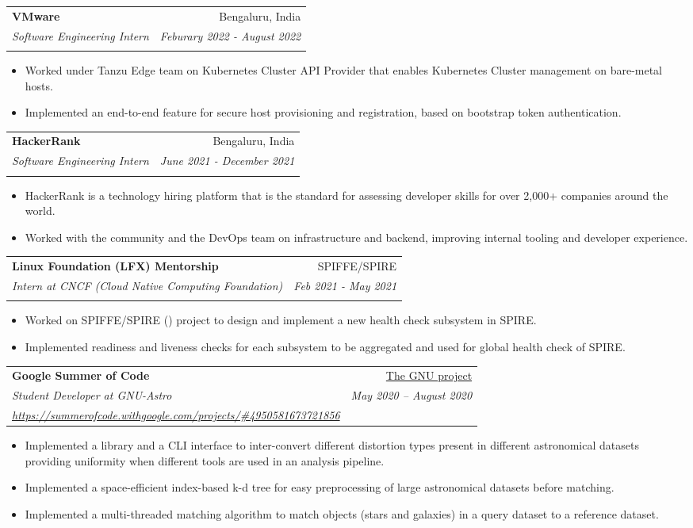 \documentclass[letterpaper,10pt]{article}
\makeatletter
\newcommand{\resumeItem}[2]{
  \item\small{
    \textbf{#1}{#2 \vspace{-2pt}}
  }
}
\newcommand{\resumeSubheading}[5]{
  \vspace{4pt}\item
    \begin{tabular*}{0.97\textwidth}[t]{l@{\extracolsep{\fill}}r}
      \textbf{#1} & #2 \\
      \textit{\small#3} & \textit{\small #4} \\
      \textit{\small#5}
    \end{tabular*}\vspace{-5pt}
}
\newcommand{\resumeItemListStart}{\begin{itemize}}
\newcommand{\resumeItemListEnd}{\end{itemize}\vspace{-5pt}}
\makeatother
\begin{document}
    \resumeSubheading
    {VMware}{Bengaluru, India}
    {Software Engineering Intern} {Feburary 2022 - August 2022}
    {\href{https://www.vmware.com/}{\color{MidnightBlue}{https://www.vmware.com/}}}
    \resumeItemListStart
    \resumeItem{}
    {Worked under Tanzu Edge team on Kubernetes Cluster API Provider \href{https://github.com/vmware-tanzu/cluster-api-provider-bringyourownhost}{\color{MidnightBlue}{BYOH}} that enables Kubernetes Cluster management on bare-metal hosts.}
    \resumeItem{}
    {Implemented an end-to-end feature for secure host provisioning and registration, based on bootstrap token authentication.}
    \resumeItemListEnd


    \resumeSubheading
    {HackerRank}{Bengaluru, India}
    {Software Engineering Intern} {June 2021 - December 2021}
    {\href{https://www.hackerrank.com/}{\color{MidnightBlue}{https://www.hackerrank.com/}}}
    \resumeItemListStart
    \resumeItem{}
    {HackerRank is a technology hiring platform that is the standard for assessing developer skills for over 2,000+ companies around the world.}
    \resumeItem{}
    {Worked with the community and the DevOps team on infrastructure and backend, improving internal tooling and developer experience.}
    \resumeItemListEnd


     \resumeSubheading
      {Linux Foundation (LFX) Mentorship}{SPIFFE/SPIRE}
      {Intern at CNCF (Cloud Native Computing Foundation)} {Feb 2021 - May 2021}
      {\href{https://mentorship.lfx.linuxfoundation.org/mentee/8375a914-cef9-4031-a718-d58d3fac013b}{\color{MidnightBlue}{https://mentorship.lfx.linuxfoundation.org/mentee/8375a914-cef9-4031-a718-d58d3fac013b}}}
      \resumeItemListStart
	\resumeItem{}
	{Worked on SPIFFE/SPIRE ({\href{https://spiffe.io/}{\color{MidnightBlue}{https://spiffe.io/}}}) project to design and implement a new health check subsystem in SPIRE.}
	\resumeItem{}
	{Implemented readiness and liveness checks for each subsystem to be aggregated and used for global health check of SPIRE.}
     \resumeItemListEnd

      
      \resumeSubheading
      {Google Summer of Code}{\href{https://www.gnu.org}{The GNU project}}
      {Student Developer at GNU-Astro} {May 2020 – August 2020}
      {\href{https://summerofcode.withgoogle.com/projects/\#4950581673721856}{\color{MidnightBlue}https://summerofcode.withgoogle.com/projects/\#4950581673721856}}
      \resumeItemListStart
        \resumeItem{}
          {Implemented a library and a CLI interface to inter-convert different distortion types present in different astronomical datasets providing uniformity when different tools are used in an analysis pipeline.}
        \resumeItem{}
          {Implemented a space-efficient index-based k-d tree for easy preprocessing of large astronomical datasets before matching.}
	\resumeItem{}
	  {Implemented a multi-threaded matching algorithm to match objects (stars and galaxies) in a query dataset to a reference dataset.}
      \resumeItemListEnd
\end{document}
